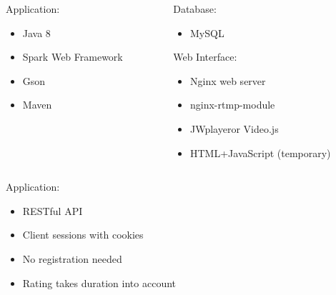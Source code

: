\begin{frame}	
	\begin{columns}[t]
		\begin{column}[t]{0.5\linewidth}
			Application:
			\begin{itemize}
				\item Java 8
				\item Spark Web Framework\footnotemark[1]
				\item Gson\footnotemark[2]
				\item Maven\footnotemark[3]
			\end{itemize}
		\end{column}
		\begin{column}[t]{0.5\linewidth}
			Database:
			\begin{itemize}
				\item MySQL
			\end{itemize}
			
			Web Interface:
			\begin{itemize}
				\item Nginx web server\footnotemark[4]
				\item nginx-rtmp-module\footnotemark[5]
				\item JWplayer\footnotemark[6] or Video.js\footnotemark[7]
				\item HTML+JavaScript (temporary)
			\end{itemize}
		\end{column}		
	\end{columns}	
	
{\tiny
}
\end{frame}

\begin{frame}	
			Application:
			\begin{itemize}
				\item RESTful API
				\item Client sessions with cookies
				\item No registration needed
				\item Rating takes duration into account
			\end{itemize}
\end{frame}

